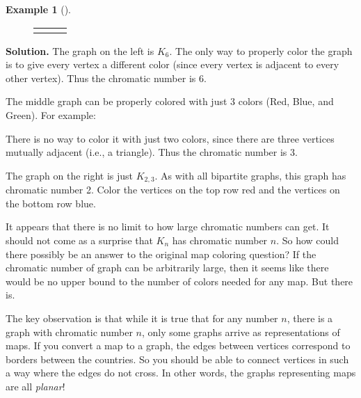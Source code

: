 \documentclass[10pt,]{book}
\theoremstyle{plain}
\theoremstyle{definition}
\newtheorem{example}[theorem]{Example}
\theoremstyle{definition}
\theoremstyle{definition}
\numberwithin{equation}{chapter}
\newlength{\panelmax}
\newcommand{\vtx}[2]{node[fill,circle,inner sep=0pt, minimum size=4pt,label=#1:#2]{}}
\newcommand{\va}[1]{\vtx{above}{#1}}
\newcommand{\vb}[1]{\vtx{below}{#1}}
\newcommand{\vr}[1]{\vtx{right}{#1}}
\newcommand{\vl}[1]{\vtx{left}{#1}}
\begin{document}
\begin{example}[]
{\begin{figure}
\begin{tabular}{@{}*{3}{c}@{}}
\begin{minipage}[c][\panelmax][t]{0.333333333333333\textwidth}\usebox{\panelboxCTimage}\end{minipage}\end{tabular}
\end{figure}
}%
\par\medskip\noindent%
\textbf{Solution.}\quad
The graph on the left is \(K_6\). The only way to properly color the graph is to give every vertex a different color (since every vertex is adjacent to every other vertex). Thus the chromatic number is 6.
%
\par

The middle graph can be properly colored with just 3 colors (Red, Blue, and Green). For example:
%
\leavevmode%
\begin{figure}
\centering
{
}
\end{figure}
\par

There is no way to color it with just two colors, since there are three vertices mutually adjacent (i.e., a triangle). Thus the chromatic number is 3.
%
\par

The graph on the right is just \(K_{2,3}\). As with all bipartite graphs, this graph has chromatic number 2. Color the vertices on the top row red and the vertices on the bottom row blue.
%
\end{example}
\par

It appears that there is no limit to how large chromatic numbers can get. It should not come as a surprise that \(K_n\) has chromatic number \(n\). So how could there possibly be an answer to the original map coloring question? If the chromatic number of graph can be arbitrarily large, then it seems like there would be no upper bound to the number of colors needed for any map. But there is.
%
\par

The key observation is that while it is true that for any number \(n\), there is a graph with chromatic number \(n\), only some graphs arrive as representations of maps. If you convert a map to a graph, the edges between vertices correspond to borders between the countries. So you should be able to connect vertices in such a way where the edges do not cross. In other words, the graphs representing maps are all \emph{planar}!
%
\par
\end{document}
